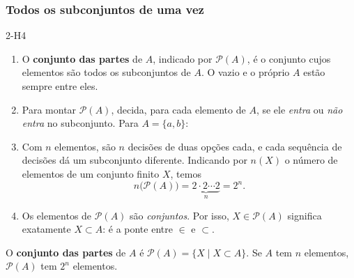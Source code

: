 \subsubsection{Todos os subconjuntos de uma vez}
\begin{construcao}{2-H4}
\begin{enumerate}[label=(\arabic*)]
  \item O \textbf{conjunto das partes} de $A$, indicado por $\mathcal{P}(A)$, é o conjunto cujos elementos são todos os subconjuntos de $A$. O vazio e o próprio $A$ estão sempre entre eles.
  \item Para montar $\mathcal{P}(A)$, decida, para cada elemento de $A$, se ele \emph{entra} ou \emph{não entra} no subconjunto. Para $A=\{a,b\}$:
\begin{center}
\end{center}
  \item Com $n$ elementos, são $n$ decisões de duas opções cada, e cada sequência de decisões dá um subconjunto diferente. Indicando por $n(X)$ o número de elementos de um conjunto finito $X$, temos
\[
n\bigl(\mathcal{P}(A)\bigr)=\underbrace{2\cdot2\cdots2}_{n}=2^{n}.
\]
  \item Os elementos de $\mathcal{P}(A)$ são \emph{conjuntos}. Por isso, $X\in\mathcal{P}(A)$ significa exatamente $X\subset A$: é a ponte entre $\in$ e $\subset$.
\end{enumerate}
\end{construcao}

\begin{definicao}
O \textbf{conjunto das partes} de $A$ é $\mathcal{P}(A)=\{X\mid X\subset A\}$. Se $A$ tem $n$ elementos, $\mathcal{P}(A)$ tem $2^n$ elementos.
\end{definicao}

